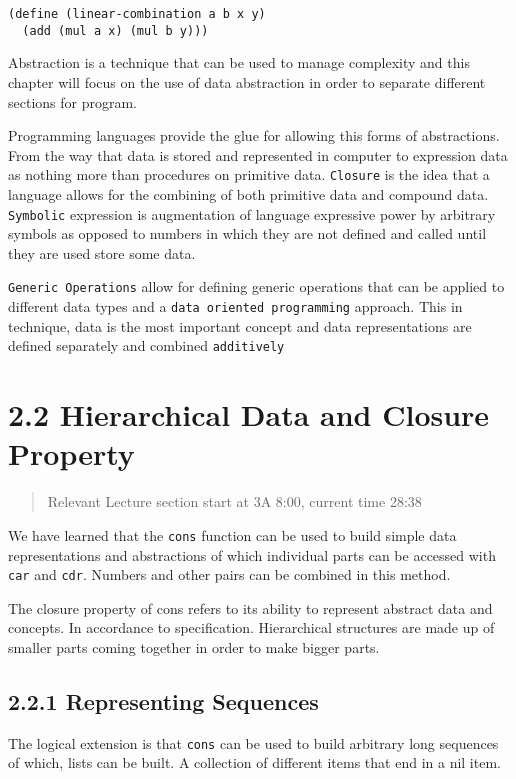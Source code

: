 \documentclass[11pt]{article}
\begin{document}
\begin{verbatim}
(define (linear-combination a b x y)
  (add (mul a x) (mul b y)))
\end{verbatim}

Abstraction is a technique that can be used to manage complexity and
this chapter will focus on the use of data abstraction in order to
separate different sections for program.

Programming languages provide the glue for allowing this forms of
abstractions. From the way that data is stored and represented in
computer to expression data as nothing more than procedures on primitive
data. \texttt{Closure} is the idea that a language allows for the combining of
both primitive data and compound data. \texttt{Symbolic} expression is
augmentation of language expressive power by arbitrary symbols as
opposed to numbers in which they are not defined and called until they
are used store some data.

\texttt{Generic Operations} allow for defining generic operations that can be
applied to different data types and a \texttt{data oriented programming}
approach. This in technique, data is the most important concept and data
representations are defined separately and combined \texttt{additively}


\section{2.2 Hierarchical Data and Closure Property}
\label{sec:org4746d37}
\begin{quote}
Relevant Lecture section start at 3A 8:00, current time 28:38
\end{quote}

We have learned that the \texttt{cons} function can be used to build simple
data representations and abstractions of which individual parts can be
accessed with \texttt{car} and \texttt{cdr}. Numbers and other pairs can be combined
in this method.

The closure property of cons refers to its ability to represent abstract
data and concepts. In accordance to specification. Hierarchical
structures are made up of smaller parts coming together in order to make
bigger parts.

\subsection{2.2.1 Representing Sequences}
\label{sec:org8df9f8c}
The logical extension is that \texttt{cons} can be used to build arbitrary long
sequences of which, lists can be built. A collection of different items
that end in a nil item.
\end{document}
